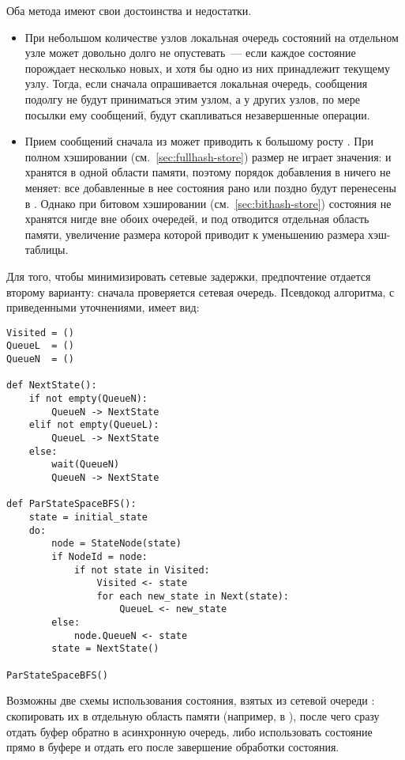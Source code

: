 Оба метода имеют свои достоинства и недостатки.
\begin{itemize}
\item При небольшом количестве узлов локальная очередь состояний на отдельном узле может
  довольно долго не опустевать~--- если каждое состояние порождает несколько новых, и хотя
  бы одно из них принадлежит текущему узлу. Тогда, если сначала опрашивается локальная
  очередь, сообщения подолгу не будут приниматься этим узлом, а у других узлов, по мере
  посылки ему сообщений, будут скапливаться незавершенные операции.
\item Прием сообщений сначала из  может приводить к большому росту
  . При полном хэшировании (см.~\ref{sec:fullhash-store}) размер
   не играет значения:  и  хранятся в одной
  области памяти, поэтому порядок добавления в  ничего не меняет: все
  добавленные в нее состояния рано или поздно будут перенесены в . Однако
  при битовом хэшировании (см.~\ref{sec:bithash-store}) состояния не хранятся нигде вне
  обоих очередей, и под  отводится отдельная область памяти, увеличение
  размера которой приводит к уменьшению размера хэш-таблицы.
\end{itemize}

Для того, чтобы минимизировать сетевые задержки, предпочтение отдается второму варианту:
сначала проверяется сетевая очередь. Псевдокод алгоритма, с приведенными уточнениями,
имеет вид:

\begin{lstlisting}[style=pseudocode]
Visited = ()
QueueL  = ()
QueueN  = ()

def NextState():
    if not empty(QueueN):
        QueueN -> NextState
    elif not empty(QueueL):
        QueueL -> NextState
    else:
        wait(QueueN)
        QueueN -> NextState

def ParStateSpaceBFS():
    state = initial_state
    do:
        node = StateNode(state)
        if NodeId = node:
            if not state in Visited:
                Visited <- state
                for each new_state in Next(state):
                    QueueL <- new_state
        else:
            node.QueueN <- state
        state = NextState()

ParStateSpaceBFS()
\end{lstlisting}

Возможны две схемы использования состояния, взятых из сетевой очереди :
скопировать их в отдельную область памяти (например, в ), после чего сразу
отдать буфер обратно в асинхронную очередь, либо использовать состояние прямо в буфере и
отдать его после завершение обработки состояния. 

